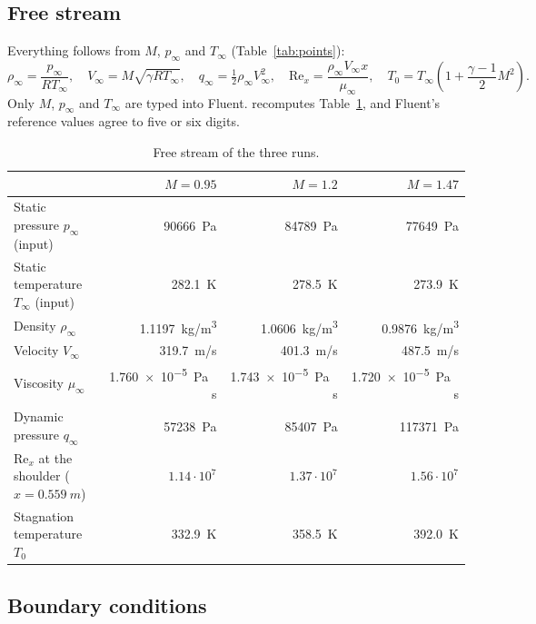 \subsection{Free stream}
\label{sec:freestream}

Everything follows from $M$, $p_\infty$ and $T_\infty$ (Table~\ref{tab:points}):
\begin{equation}
\rho_\infty = \frac{p_\infty}{R T_\infty}, \quad
V_\infty = M\sqrt{\gamma R T_\infty}, \quad
q_\infty = \tfrac12\rho_\infty V_\infty^2, \quad
\mathrm{Re}_x = \frac{\rho_\infty V_\infty x}{\mu_\infty}, \quad
T_0 = T_\infty\left(1 + \frac{\gamma - 1}{2}M^2\right).
\end{equation}
Only $M$, $p_\infty$ and $T_\infty$ are typed into Fluent.  recomputes
Table~\ref{tab:freestream}, and Fluent's reference values agree to five or six digits.

\begin{table}[H]
\centering
\caption{Free stream of the three runs.}
\label{tab:freestream}
\small
\begin{tabular}{@{}lrrr@{}}
\toprule
 & $M = 0.95$ & $M = 1.2$ & $M = 1.47$ \\
\midrule
Static pressure $p_\infty$ (input) & \SI{90666}{Pa} & \SI{84789}{Pa} & \SI{77649}{Pa} \\
Static temperature $T_\infty$ (input) & \SI{282.1}{K} & \SI{278.5}{K} & \SI{273.9}{K} \\
Density $\rho_\infty$ & \SI{1.1197}{kg/m^3} & \SI{1.0606}{kg/m^3} & \SI{0.9876}{kg/m^3} \\
Velocity $V_\infty$ & \SI{319.7}{m/s} & \SI{401.3}{m/s} & \SI{487.5}{m/s} \\
Viscosity $\mu_\infty$ & \SI{1.760e-5}{Pa\,s} & \SI{1.743e-5}{Pa\,s} & \SI{1.720e-5}{Pa\,s} \\
Dynamic pressure $q_\infty$ & \SI{57238}{Pa} & \SI{85407}{Pa} & \SI{117371}{Pa} \\
$\mathrm{Re}_x$ at the shoulder ($x = \SI{0.559}{m}$) & $1.14\cdot10^{7}$ & $1.37\cdot10^{7}$ & $1.56\cdot10^{7}$ \\
Stagnation temperature $T_0$ & \SI{332.9}{K} & \SI{358.5}{K} & \SI{392.0}{K} \\
\bottomrule
\end{tabular}
\end{table}

\subsection{Boundary conditions}
\label{sec:bc}

